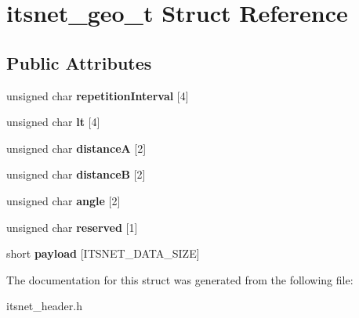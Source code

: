 \hypertarget{structitsnet__geo__t}{\section{itsnet\-\_\-geo\-\_\-t \-Struct \-Reference}
\label{structitsnet__geo__t}
}
\subsection*{\-Public \-Attributes}
\begin{DoxyCompactItemize}
\item 
\hypertarget{structitsnet__geo__t_acc10cf74fc926a87c39ac03268e61238}{unsigned char {\bfseries repetition\-Interval} \mbox{[}4\mbox{]}}\label{structitsnet__geo__t_acc10cf74fc926a87c39ac03268e61238}

\item 
\hypertarget{structitsnet__geo__t_af778a006da4feb8f5d68f19a39923cac}{unsigned char {\bfseries lt} \mbox{[}4\mbox{]}}\label{structitsnet__geo__t_af778a006da4feb8f5d68f19a39923cac}

\item 
\hypertarget{structitsnet__geo__t_aa0ddd25efd7a9c9798274fc2bc8b6261}{unsigned char {\bfseries distance\-A} \mbox{[}2\mbox{]}}\label{structitsnet__geo__t_aa0ddd25efd7a9c9798274fc2bc8b6261}

\item 
\hypertarget{structitsnet__geo__t_a88855ef2001df34122587cb0432b5d8c}{unsigned char {\bfseries distance\-B} \mbox{[}2\mbox{]}}\label{structitsnet__geo__t_a88855ef2001df34122587cb0432b5d8c}

\item 
\hypertarget{structitsnet__geo__t_a2cf08ec496707f78c56ecb2ccb5b1860}{unsigned char {\bfseries angle} \mbox{[}2\mbox{]}}\label{structitsnet__geo__t_a2cf08ec496707f78c56ecb2ccb5b1860}

\item 
\hypertarget{structitsnet__geo__t_ad0911f48c27f8e724430cb94cc509975}{unsigned char {\bfseries reserved} \mbox{[}1\mbox{]}}\label{structitsnet__geo__t_ad0911f48c27f8e724430cb94cc509975}

\item 
\hypertarget{structitsnet__geo__t_a352953bd0f7bb2c170e9c88f93c4db84}{short {\bfseries payload} \mbox{[}\-I\-T\-S\-N\-E\-T\-\_\-\-D\-A\-T\-A\-\_\-\-S\-I\-Z\-E\mbox{]}}\label{structitsnet__geo__t_a352953bd0f7bb2c170e9c88f93c4db84}

\end{DoxyCompactItemize}


\-The documentation for this struct was generated from the following file\-:\begin{DoxyCompactItemize}
\item 
itsnet\-\_\-header.\-h\end{DoxyCompactItemize}
